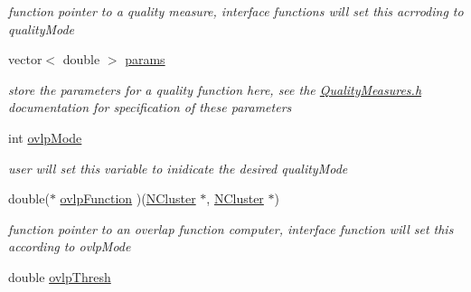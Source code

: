 \begin{DoxyCompactItemize}
\begin{DoxyCompactList}\small\item\em function pointer to a quality measure, interface functions will set this acrroding to qualityMode \item\end{DoxyCompactList}\item 
\hypertarget{class_lattice_algos_a84a7c48411084ff5d792af41e57ce96a}{
vector$<$ double $>$ \hyperlink{class_lattice_algos_a84a7c48411084ff5d792af41e57ce96a}{params}}
\label{class_lattice_algos_a84a7c48411084ff5d792af41e57ce96a}

\begin{DoxyCompactList}\small\item\em store the parameters for a quality function here, see the \hyperlink{_quality_measures_8h_source}{QualityMeasures.h} documentation for specification of these parameters \item\end{DoxyCompactList}\item 
\hypertarget{class_lattice_algos_a7a9a7568a564e929c494c7c94ed5dda5}{
int \hyperlink{class_lattice_algos_a7a9a7568a564e929c494c7c94ed5dda5}{ovlpMode}}
\label{class_lattice_algos_a7a9a7568a564e929c494c7c94ed5dda5}

\begin{DoxyCompactList}\small\item\em user will set this variable to inidicate the desired qualityMode \item\end{DoxyCompactList}\item 
\hypertarget{class_lattice_algos_ad2bd9f8cb22cb27dfe527dd2bc38ec2d}{
double($\ast$ \hyperlink{class_lattice_algos_ad2bd9f8cb22cb27dfe527dd2bc38ec2d}{ovlpFunction} )(\hyperlink{class_n_cluster}{NCluster} $\ast$, \hyperlink{class_n_cluster}{NCluster} $\ast$)}
\label{class_lattice_algos_ad2bd9f8cb22cb27dfe527dd2bc38ec2d}

\begin{DoxyCompactList}\small\item\em function pointer to an overlap function computer, interface function will set this according to ovlpMode \item\end{DoxyCompactList}\item 
\hypertarget{class_lattice_algos_ae50e2eab1478e1bced92b0f1f1bcdc09}{
double \hyperlink{class_lattice_algos_ae50e2eab1478e1bced92b0f1f1bcdc09}{ovlpThresh}}
\label{class_lattice_algos_ae50e2eab1478e1bced92b0f1f1bcdc09}


\end{DoxyCompactItemize}

